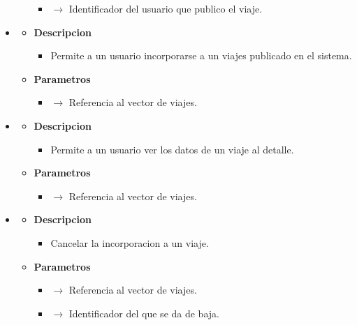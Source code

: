 \begin{itemize}
\begin{itemize}
\begin{itemize}
            \item {} $\rightarrow$ Identificador del usuario que publico el viaje.
		\end{itemize}
	\end{itemize}
    \item {}
    \begin{itemize}
        \item \textbf{Descripcion}
        \begin{itemize}
			\item  Permite a un usuario incorporarse a un viajes publicado en el sistema.
		\end{itemize}
		\item \textbf{Parametros}
		\begin{itemize}
			\item {}  $\rightarrow$ Referencia al vector de viajes.
		\end{itemize}
	\end{itemize}
    \newpage
    \item{}
    \begin{itemize}
        \item \textbf{Descripcion}
        \begin{itemize}
			\item  Permite a un usuario ver los datos de un viaje al detalle.
		\end{itemize}
		\item \textbf{Parametros}
		\begin{itemize}
			\item {}  $\rightarrow$ Referencia al vector de viajes.
		\end{itemize}
	\end{itemize}
    \item{}
    \begin{itemize}
        \item \textbf{Descripcion}
        \begin{itemize}
			\item  Cancelar la incorporacion a un viaje.
		\end{itemize}
		\item \textbf{Parametros}
		\begin{itemize}
			\item {}  $\rightarrow$ Referencia al vector de viajes.
            \item {} $\rightarrow$ Identificador del que se da de baja.

\end{itemize}
\end{itemize}
\end{itemize}
